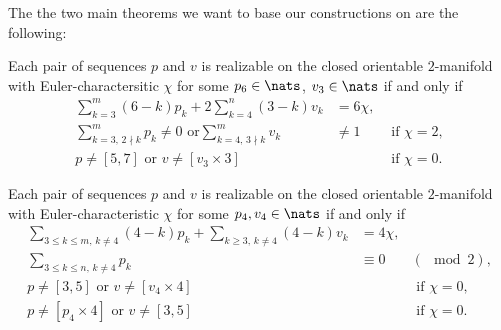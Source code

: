 The the two main theorems we want to base our constructions on are the following:

\begin{theorem} \label{thm:eberhard:extended:3}
  Each pair of sequences $p$ and $v$ is realizable on the closed orientable $2$-manifold with {\sc Euler}-charactersitic $\chi$ for some $p_6 \in \nats$, $v_3 \in \nats$ if and only if
  \begin{align*}
    \sum_{k=3}^m (6-k)p_k + 2 \sum_{k=4}^n (3-k)v_k &= 6\chi, \\
    \sum_{k=3,\, 2 \nmid k}^{m} p_k \neq 0 \text{ or} \sum_{k=4, \,3 \nmid k}^m v_k &\neq 1 &\text{ if } \chi = 2, \\
    p \neq [5, 7] \text{ or } v \neq [v_3 \times 3]  &&\text{ if } \chi = 0.
  \end{align*}
\end{theorem}

\begin{theorem} \label{thm:eberhard:extended:4}
  Each pair of sequences $p$ and $v$ is realizable on the closed orientable $2$-manifold with {\sc Euler}-characteristic $\chi$ for some $p_4, v_4 \in \nats$ if and only if
  \begin{align*}
    \sum_{3 \leq k \leq m,\, k \neq 4} (4-k)p_k + \sum_{k \geq 3,\, k\neq 4} (4-k)v_k &= 4\chi, \\
    \sum_{3 \leq k \leq n,\, k \neq 4} p_k &\equiv 0& (\mod 2), \\
    p \neq [3, 5] \text{ or } v \neq [v_4 \times 4] &&\text{ if } \chi = 0,\\
    p \neq [p_4 \times 4] \text{ or } v \neq [3, 5] &&\text{ if } \chi = 0.
  \end{align*}
\end{theorem}
